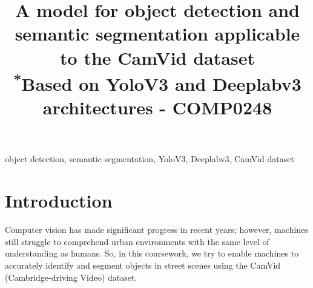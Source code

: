 \documentclass[conference]{IEEEtran}
\begin{document}
\title{A model for object detection and semantic segmentation applicable to the CamVid dataset\\
{\footnotesize \textsuperscript{*}Based on YoloV3 and Deeplabv3 architectures - COMP0248}
}

\author{}

\maketitle

\begin{abstract}


\end{abstract}

\begin{IEEEkeywords}
object detection, semantic segmentation, YoloV3, Deeplabv3, CamVid dataset
\end{IEEEkeywords}

\section{Introduction}




Computer vision has made significant progress in recent years; however, machines still struggle to comprehend urban environments with the same level of understanding as humans. So, in this coursework, we try to enable machines to accurately identify and segment objects in street scenes using the CamVid (Cambridge-driving Video) dataset.
 
\end{document}
